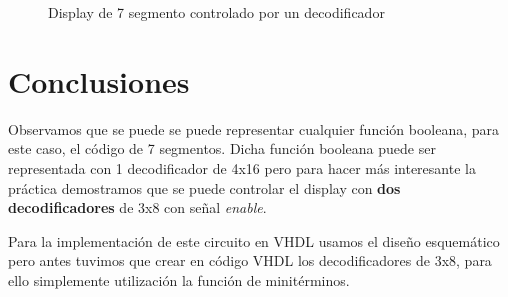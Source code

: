 \documentclass{mylib/reporteConCalif}
\begin{document}
\begin{figure}[H]%
    \centering
    \qquad
    \caption{Display de 7 segmento controlado por un decodificador}%
    \label{fig:example}%
\end{figure}

\section{Conclusiones}

Observamos que se puede se puede representar cualquier función booleana, para este caso, el código de 7 segmentos. Dicha función booleana puede ser representada con 1 decodificador de 4x16 pero para hacer más interesante la práctica demostramos que se puede controlar el display con \textbf{dos decodificadores} de 3x8 con señal \textit{enable}.

Para la implementación de este circuito en VHDL usamos el diseño esquemático pero antes tuvimos que crear en código VHDL los decodificadores de 3x8, para ello simplemente utilización la función de minitérminos.
\end{document}

